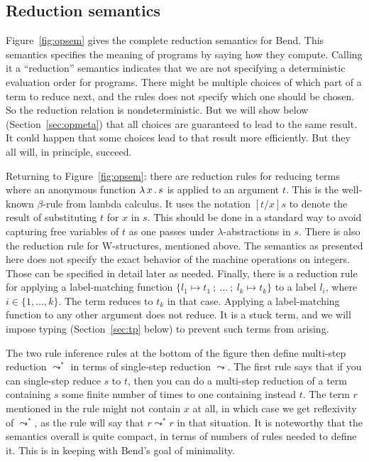 \documentclass{article}
\begin{document}
\subsection{Reduction semantics}

Figure~\ref{fig:opsem} gives the complete reduction semantics for
Bend.  This semantics specifies the meaning of programs by saying how
they compute.  Calling it a ``reduction'' semantics indicates that we
are not specifying a deterministic evaluation order for programs.
There might be multiple choices of which part of a term to reduce
next, and the rules does not specify which one should be chosen.  So
the reduction relation is nondeterministic.  But we will show below
(Section~\ref{sec:opmeta}) that all choices are guaranteed to lead to
the same result.  It could happen that some choices lead to that
result more efficiently.  But they all will, in principle, succeed.

Returning to Figure~\ref{fig:opsem}: there are reduction rules for
reducing terms where an anonymous function $\lambda\, x\, .\, s$ is applied to
an argument $t$.  This is the well-known $\beta$-rule from lambda
calculus.  It uses the notation $[t/x]s$ to denote the result of
substituting $t$ for $x$ in $s$.  This should be done in a standard
way to avoid capturing free variables of $t$ as one passes under
$\lambda$-abstractions in $s$.  There is also the reduction rule for
W-structures, mentioned above.  The semantics as presented here does
not specify the exact behavior of the machine operations on integers.
Those can be specified in detail later as needed.  Finally, there is a
reduction rule for applying a label-matching function $\{ l_1 \mapsto
t_1\ ;\ \ldots\ ;\ l_k\mapsto t_k \}$ to a label $l_i$, where
$i\in\{1,\ldots,k\}$.  The term reduces to $t_k$ in that case.
Applying a label-matching function to any other argument does not
reduce.  It is a stuck term, and we will impose typing
(Section~\ref{sec:tp} below) to prevent such terms from arising.

The two rule inference rules at the bottom of the figure then define
multi-step reduction $\leadsto^*$ in terms of single-step reduction
$\leadsto$.  The first rule says that if you can single-step reduce
$s$ to $t$, then you can do a multi-step reduction of a term
containing $s$ some finite number of times to one containing instead
$t$.  The term $r$ mentioned in the rule might not contain $x$ at all,
in which case we get reflexivity of $\leadsto^*$, as the rule will say
that $r \leadsto^* r$ in that situation.  It is noteworthy that the
semantics overall is quite compact, in terms of numbers of rules
needed to define it.  This is in keeping with Bend's goal of
minimality.
\end{document}
